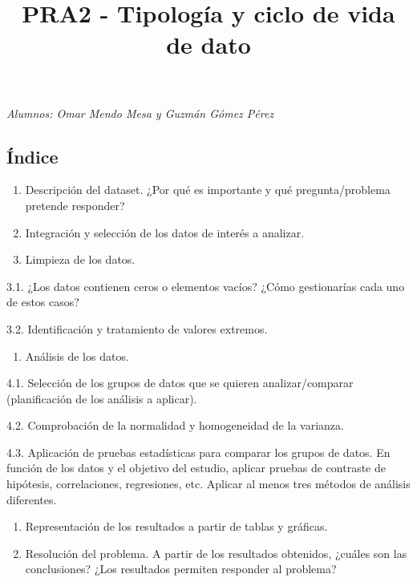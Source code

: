 \documentclass[]{article}
\title{PRA2 - Tipología y ciclo de vida de dato}
\author{}
\date{\vspace{-2.5em}}
\providecommand{\tightlist}{%
  \setlength{\itemsep}{0pt}\setlength{\parskip}{0pt}}
\begin{document}
\maketitle

\emph{Alumnos: Omar Mendo Mesa y Guzmán Gómez Pérez }

\hypertarget{uxedndice}{%
\subsection{Índice}\label{uxedndice}}

\begin{enumerate}
\def\labelenumi{\arabic{enumi}.}
\item
  Descripción del dataset. ¿Por qué es importante y qué
  pregunta/problema pretende responder?
\item
  Integración y selección de los datos de interés a analizar.
\item
  Limpieza de los datos.
\end{enumerate}

3.1. ¿Los datos contienen ceros o elementos vacíos? ¿Cómo gestionarías
cada uno de estos casos?

3.2. Identificación y tratamiento de valores extremos.

\begin{enumerate}
\def\labelenumi{\arabic{enumi}.}
\setcounter{enumi}{3}
\tightlist
\item
  Análisis de los datos.
\end{enumerate}

4.1. Selección de los grupos de datos que se quieren analizar/comparar
(planificación de los análisis a aplicar).

4.2. Comprobación de la normalidad y homogeneidad de la varianza.

4.3. Aplicación de pruebas estadísticas para comparar los grupos de
datos. En función de los datos y el objetivo del estudio, aplicar
pruebas de contraste de hipótesis, correlaciones, regresiones, etc.
Aplicar al menos tres métodos de análisis diferentes.

\begin{enumerate}
\def\labelenumi{\arabic{enumi}.}
\setcounter{enumi}{4}
\item
  Representación de los resultados a partir de tablas y gráficas.
\item
  Resolución del problema. A partir de los resultados obtenidos, ¿cuáles
  son las conclusiones? ¿Los resultados permiten responder al problema?
\end{enumerate}
\end{document}
